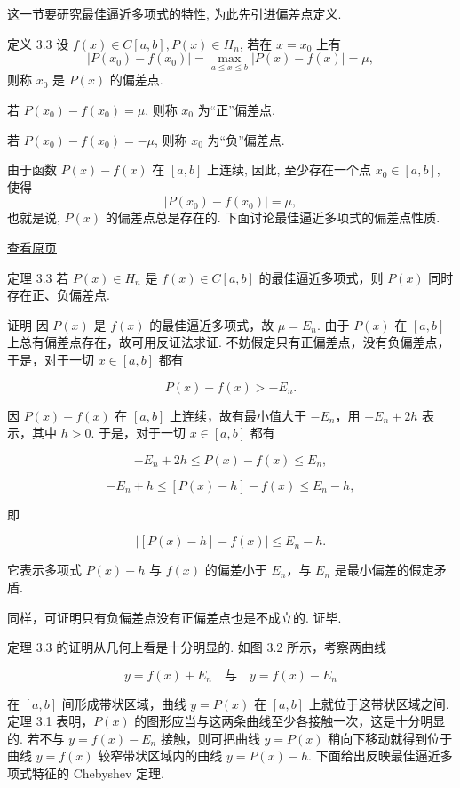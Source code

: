 \documentclass[
  10pt,
  fontset=fandol]{ctexart}
\begin{document}
这一节要研究最佳逼近多项式的特性, 为此先引进偏差点定义.

定义 3.3 设 \(f(x) \in C[a,b], P(x) \in H_n\), 若在 \(x = x_0\) 上有 \[
|P(x_0) - f(x_0)| = \max_{a \leqslant x \leqslant b}|P(x) - f(x)| = \mu,
\] 则称 \(x_0\) 是 \(P(x)\) 的偏差点.

若 \(P(x_0) - f(x_0) = \mu\), 则称 \(x_0\) 为``正''偏差点.

若 \(P(x_0) - f(x_0) = -\mu\), 则称 \(x_0\) 为``负''偏差点.

由于函数 \(P(x) - f(x)\) 在 \([a,b]\) 上连续, 因此, 至少存在一个点 \(x_0 \in [a,b]\), 使得 \[
|P(x_0) - f(x_0)| = \mu,
\] 也就是说, \(P(x)\) 的偏差点总是存在的. 下面讨论最佳逼近多项式的偏差点性质.

\href{../../source-images/pdf-062.jpeg}{查看原页}

定理 3.3 若 \(P(x) \in H_n\) 是 \(f(x) \in C[a,b]\) 的最佳逼近多项式，则 \(P(x)\) 同时存在正、负偏差点.

证明 因 \(P(x)\) 是 \(f(x)\) 的最佳逼近多项式，故 \(\mu = E_n\). 由于 \(P(x)\) 在 \([a,b]\) 上总有偏差点存在，故可用反证法求证. 不妨假定只有正偏差点，没有负偏差点，于是，对于一切 \(x \in [a,b]\) 都有

\[
P(x) - f(x) > -E_n.
\]

因 \(P(x) - f(x)\) 在 \([a,b]\) 上连续，故有最小值大于 \(-E_n\)，用 \(-E_n + 2h\) 表示，其中 \(h > 0\). 于是，对于一切 \(x \in [a,b]\) 都有

\[
-E_n + 2h \leqslant P(x) - f(x) \leqslant E_n,
\]

\[
-E_n + h \leqslant [P(x) - h] - f(x) \leqslant E_n - h,
\]

即

\[
|[P(x) - h] - f(x)| \leqslant E_n - h.
\]

它表示多项式 \(P(x) - h\) 与 \(f(x)\) 的偏差小于 \(E_n\)，与 \(E_n\) 是最小偏差的假定矛盾.

同样，可证明只有负偏差点没有正偏差点也是不成立的. 证毕.

定理 3.3 的证明从几何上看是十分明显的. 如图 3.2 所示，考察两曲线

\[
y = f(x) + E_n \quad \text{与} \quad y = f(x) - E_n
\]

在 \([a,b]\) 间形成带状区域，曲线 \(y = P(x)\) 在 \([a,b]\) 上就位于这带状区域之间. 定理 3.1 表明，\(P(x)\) 的图形应当与这两条曲线至少各接触一次，这是十分明显的. 若不与 \(y = f(x) - E_n\) 接触，则可把曲线 \(y = P(x)\) 稍向下移动就得到位于曲线 \(y = f(x)\) 较窄带状区域内的曲线 \(y = P(x) - h\). 下面给出反映最佳逼近多项式特征的 Chebyshev 定理.
\end{document}
